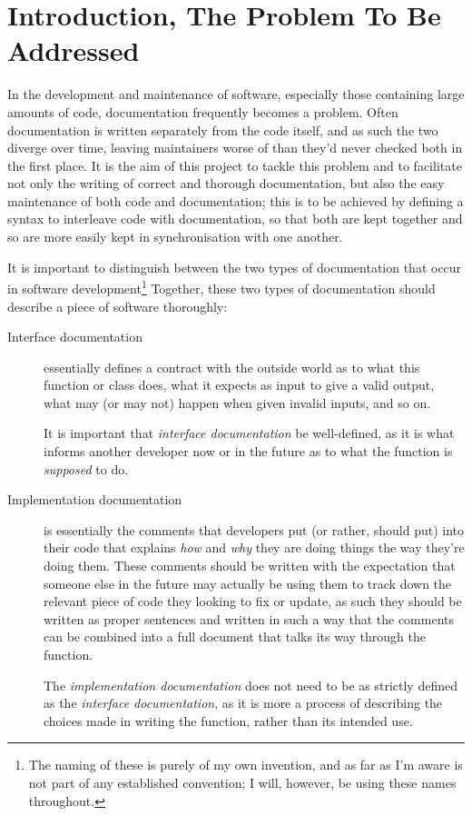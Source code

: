 \section{Introduction, The Problem To Be Addressed}

In the development and maintenance of software, especially those
containing large amounts of code, documentation frequently becomes a
problem. Often documentation is written separately from the code
itself, and as such the two diverge over time, leaving maintainers
worse of than they'd never checked both in the first place. It is the
aim of this project to tackle this problem and to facilitate not only
the writing of correct and thorough documentation, but also the easy
maintenance of both code and documentation; this is to be achieved by
defining a syntax to interleave code with documentation, so that both
are kept together and so are more easily kept in synchronisation with
one another.

It is important to distinguish between the two types of documentation
that occur in software development\footnote{The naming of these is
purely of my own invention, and as far as I'm aware is not part of any
established convention; I will, however, be using these names
throughout.} Together, these two types of documentation should
describe a piece of software thoroughly:
\begin{description}
\item[Interface documentation] essentially defines a contract with the
outside world as to what this function or class does, what it expects
as input to give a valid output, what may (or may not) happen when
given invalid inputs, and so on.

It is important that \emph{interface documentation} be well-defined,
as it is what informs another developer now or in the future as to
what the function is \emph{supposed} to do.

\item[Implementation documentation] is essentially the comments that
developers put (or rather, should put) into their code that
explains \emph{how} and \emph{why} they are doing things the way
they're doing them. These comments should be written with the
expectation that someone else in the future may actually be using them
to track down the relevant piece of code they looking to fix or
update, as such they should be written as proper sentences and written
in such a way that the comments can be combined into a full document
that talks its way through the function.

The \emph{implementation documentation} does not need to be as
strictly defined as the \emph{interface documentation}, as it is more
a process of describing the choices made in writing the function,
rather than its intended use.
\end{description}

